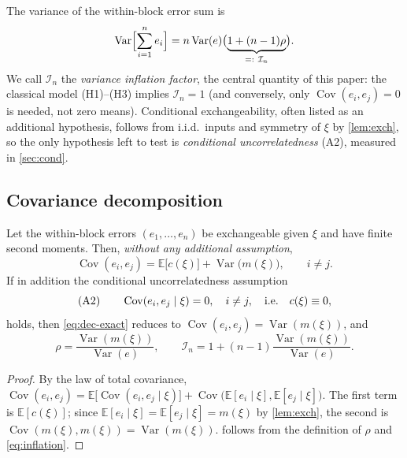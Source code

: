 \documentclass[twocolumn,review,hidelinks,oneeqnum,onetabnum,onefignum,onethmnum]{siamart251216}
\begin{document}
The variance of the within-block error sum is
\begin{equation}
\operatorname{Var}\Bigl[\sum_{i=1}^{n}e_i\Bigr]
= n\operatorname{Var}(e)\bigl(\underbrace{1+(n-1)\rho}_{=:\ \mathcal I_n}\bigr).
\label{eq:inflation}
\end{equation}
We call $\mathcal I_n$ the \emph{variance inflation factor}, the central quantity
of this paper: the classical model (H1)--(H3) implies $\mathcal I_n=1$ (and
conversely, only $\operatorname{Cov}(e_i,e_j)=0$ is needed, not zero means).
Conditional exchangeability, often listed as an additional hypothesis, follows
from i.i.d.\ inputs and symmetry of $\xi$ by \cref{lem:exch}, so the only
hypothesis left to test is \emph{conditional uncorrelatedness} (A2), measured in
\cref{sec:cond}.

\subsection{Covariance decomposition}

\begin{proposition}
\label{prop:decomp}
Let the within-block errors $(e_1,\dots,e_n)$ be exchangeable given $\xi$ and
have finite second moments. Then, \emph{without any additional assumption},
\begin{equation}
\operatorname{Cov}(e_i,e_j)=\mathbb{E}\bigl[c(\xi)\bigr]+\operatorname{Var}\bigl(m(\xi)\bigr),
\qquad i\ne j .
\label{eq:dec-exact}
\end{equation}
If in addition the conditional uncorrelatedness assumption
\begin{equation}
\textup{(A2)}\qquad
\operatorname{Cov}(e_i,e_j\mid\xi)=0,\quad i\ne j,
\quad\text{i.e.}\quad c(\xi)\equiv0,
\label{eq:A2}
\end{equation}
holds, then \cref{eq:dec-exact} reduces to
$\operatorname{Cov}(e_i,e_j)=\operatorname{Var}(m(\xi))$, and
\begin{equation}
\rho=\frac{\operatorname{Var}(m(\xi))}{\operatorname{Var}(e)},
\qquad
\mathcal I_n=1+(n-1)\frac{\operatorname{Var}(m(\xi))}{\operatorname{Var}(e)} .
\label{eq:rho}
\end{equation}
\end{proposition}

\begin{proof}
By the law of total covariance,
$\operatorname{Cov}(e_i,e_j)
=\mathbb{E}\bigl[\operatorname{Cov}(e_i,e_j\mid\xi)\bigr]
+\operatorname{Cov}\bigl(\mathbb{E}[e_i\mid\xi],\mathbb{E}[e_j\mid\xi]\bigr)$.
The first term is $\mathbb{E}[c(\xi)]$; since
$\mathbb{E}[e_i\mid\xi]=\mathbb{E}[e_j\mid\xi]=m(\xi)$ by \cref{lem:exch}, the
second is $\operatorname{Cov}(m(\xi),m(\xi))=\operatorname{Var}(m(\xi))$.
 follows from the definition of $\rho$ and \cref{eq:inflation}.
\end{proof}
\end{document}
